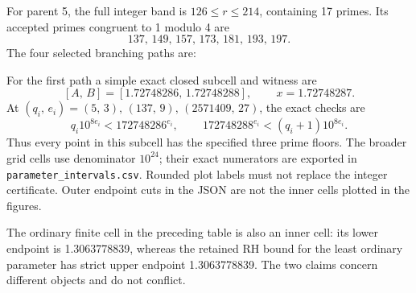\documentclass[11pt,reqno]{amsart}
\newlength{\CenteredRowHeight}
\newcommand{\CenteredTableWidths}[6]{%
  \def\CenteredWidthA{#1}\def\CenteredWidthB{#2}%
  \def\CenteredWidthC{#3}\def\CenteredWidthD{#4}%
  \def\CenteredWidthE{#5}\def\CenteredWidthF{#6}}
\newcommand{\CenteredMeasure}[3]{%
  \global\setbox#1=\hbox{\parbox[c]{#2}{%
    \centering\setlength{\parindent}{0pt}#3\par}}%
  \ifdim\dimexpr\ht#1+\dp#1\relax>\CenteredRowHeight
    \global\CenteredRowHeight=\dimexpr\ht#1+\dp#1\relax
  \fi}
\newcommand{\CenteredRender}[2]{%
  \parbox[c][\CenteredRowHeight][c]{#2}{%
    \centering\setlength{\parindent}{0pt}\usebox{#1}\par}}
\newcommand{\CenteredRowThree}[4][0pt]{%
  \global\CenteredRowHeight=0pt\relax%
  \CenteredMeasure{\CenteredBoxA}{\CenteredWidthA}{#2}%
  \CenteredMeasure{\CenteredBoxB}{\CenteredWidthB}{#3}%
  \CenteredMeasure{\CenteredBoxC}{\CenteredWidthC}{#4}%
  \global\advance\CenteredRowHeight by \dimexpr 2pt+#1\relax%
  \CenteredRender{\CenteredBoxA}{\CenteredWidthA} &%
  \CenteredRender{\CenteredBoxB}{\CenteredWidthB} &%
  \CenteredRender{\CenteredBoxC}{\CenteredWidthC}}
\theoremstyle{blueplain}
\providecommand{\comma}{\allowbreak,\,}
\numberwithin{equation}{section}
\def\hyperlink#1#2{#2}}
\begin{document}
For parent 5, the full integer band is \(126\le r\le214\), containing
17 primes. Its accepted primes congruent to 1 modulo 4 are
\[
137\comma149\comma157\comma173\comma181\comma193\comma197.
\]
The four selected branching paths are:
\begin{table}[H]\centering\scriptsize
\caption{Four finite modular paths, not the complete tree.}\label{tab:mod-branches}
\CenteredTableWidths{3cm}{5.2cm}{7.2cm}{1pt}{1pt}{1pt}
\end{table}
For the first path a simple exact closed subcell and witness are
\[
[A\comma B]=[1.72748286\comma1.72748288]\comma\qquad
x=1.72748287.
\]
At \((q_i\comma e_i)=(5\comma3)\comma(137\comma9)\comma(2571409\comma27)\),
the exact checks are
\[
q_i10^{8e_i}<172748286^{e_i}\comma\qquad
172748288^{e_i}<(q_i+1)10^{8e_i}.
\]
Thus every point in this subcell has the specified three prime floors.
\hypertarget{term:JSON}{}
\hypertarget{term:CSV}{}
The broader grid cells use denominator \(10^{24}\); their exact
numerators are exported in \texttt{parameter\_intervals.csv}. Rounded
plot labels must not replace the integer certificate. Outer endpoint
cuts in the \hyperlink{abbr:JSON}{JSON} are not the inner cells plotted in the figures.

The ordinary finite cell in the preceding table is also an inner cell:
its lower endpoint is 1.3063778839, whereas the retained \hyperlink{def:RH}{RH} bound for
the least ordinary parameter has strict upper endpoint 1.3063778839.
The two claims concern different objects and do not conflict.
\end{document}
